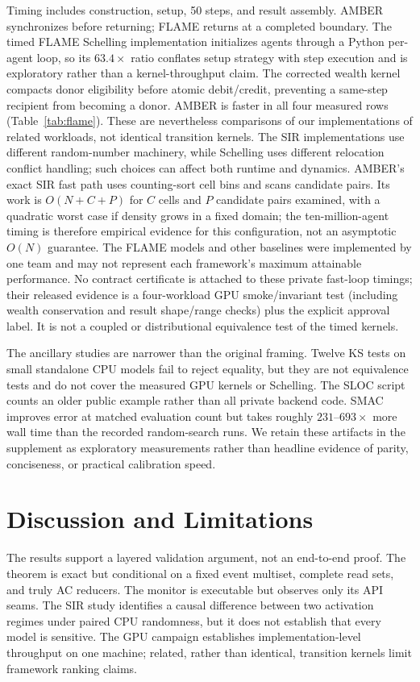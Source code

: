 \documentclass[sigconf,nonacm,review,natbib=true]{acmart}
\theoremstyle{definition}
\theoremstyle{plain}
\theoremstyle{remark}
\begin{document}
Timing includes construction, setup, 50 steps, and result assembly. AMBER
synchronizes before returning; FLAME returns at a completed boundary. The
timed FLAME Schelling implementation initializes agents through a Python
per-agent loop, so its $63.4\times$ ratio conflates setup strategy with step
execution and is exploratory rather than a kernel-throughput claim. The
corrected wealth kernel compacts donor eligibility before atomic debit/credit,
preventing a same-step
recipient from becoming a donor. AMBER is faster in all four measured rows
(Table~\ref{tab:flame}). These are nevertheless comparisons of our
implementations of related workloads, not identical transition kernels. The
SIR implementations use different random-number machinery, while Schelling
uses different relocation conflict handling; such choices can affect both
runtime and dynamics. AMBER's exact SIR fast path uses counting-sort cell bins
and scans candidate pairs. Its work is $O(N+C+P)$ for $C$ cells and $P$
candidate pairs examined, with a quadratic worst case if density grows in a
fixed domain; the ten-million-agent timing is therefore empirical evidence for
this configuration, not an asymptotic $O(N)$ guarantee. The FLAME models and
other baselines were implemented by one team and may not represent each
framework's maximum attainable performance.
No contract certificate is attached to these private fast-loop timings; their
released evidence is a four-workload GPU smoke/invariant test (including wealth
conservation and result shape/range checks) plus the explicit approval label.
It is not a coupled or distributional equivalence test of the timed kernels.

The ancillary studies are narrower than the original framing. Twelve KS tests
on small standalone CPU models fail to reject equality, but they are not
equivalence tests and do not cover the measured GPU kernels or Schelling. The
SLOC script counts an older public example rather than all private backend code.
SMAC improves error at matched evaluation count but takes roughly
$231$--$693\times$ more wall time than the recorded random-search runs. We retain
these artifacts in the supplement as exploratory measurements rather than
headline evidence of parity, conciseness, or practical calibration speed.

\section{Discussion and Limitations}

The results support a layered validation argument, not an end-to-end proof.
The theorem is exact but conditional on a fixed event multiset, complete read
sets, and truly AC reducers. The monitor is executable but observes only its API
seams. The SIR study identifies a causal difference between two activation
regimes under paired CPU randomness, but it does not establish that every model
is sensitive. The GPU campaign establishes implementation-level throughput on
one machine; related, rather than identical, transition kernels limit framework
ranking claims.
\end{document}
